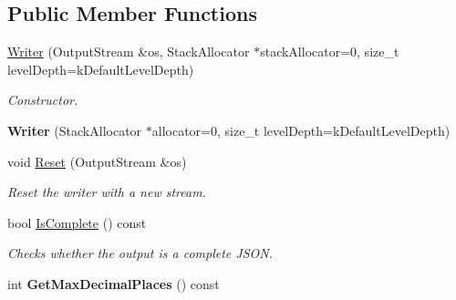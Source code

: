 \subsection*{Public Member Functions}
\begin{DoxyCompactItemize}
\item 
\hyperlink{class_writer_af4f54830d6927d9daf5bd53bfd134dd3}{Writer} (Output\+Stream \&os, Stack\+Allocator $\ast$stack\+Allocator=0, size\+\_\+t level\+Depth=k\+Default\+Level\+Depth)
\begin{DoxyCompactList}\small\item\em Constructor. \end{DoxyCompactList}\item 
{\bfseries Writer} (Stack\+Allocator $\ast$allocator=0, size\+\_\+t level\+Depth=k\+Default\+Level\+Depth)\hypertarget{class_writer_a7b885cea71542fc436be80eff447fb64}{}\label{class_writer_a7b885cea71542fc436be80eff447fb64}

\item 
void \hyperlink{class_writer_a8b53e8f137f7fcf694f5500711b3f58d}{Reset} (Output\+Stream \&os)
\begin{DoxyCompactList}\small\item\em Reset the writer with a new stream. \end{DoxyCompactList}\item 
bool \hyperlink{class_writer_a446cfad4b88cfd69b1b63d57989f2e76}{Is\+Complete} () const 
\begin{DoxyCompactList}\small\item\em Checks whether the output is a complete J\+S\+ON. \end{DoxyCompactList}\item 
int {\bfseries Get\+Max\+Decimal\+Places} () const \hypertarget{class_writer_abbd76fd072c7feca94ddb0a02fb6e44b}{}\label{class_writer_abbd76fd072c7feca94ddb0a02fb6e44b}


\end{DoxyCompactItemize}
